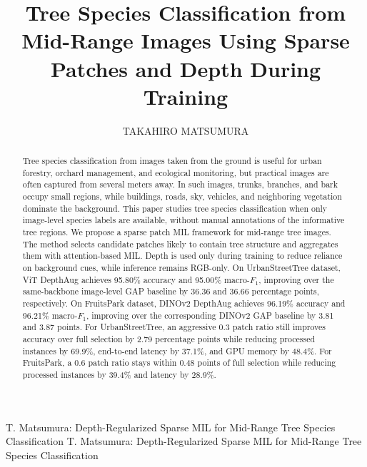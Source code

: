 \documentclass{ieeeaccess}
\begin{document}

\title{Tree Species Classification from Mid-Range Images Using Sparse Patches and Depth During Training}

\author{\uppercase{Takahiro Matsumura}}

\address[1]{Affiliation to be confirmed.}


\markboth
{T. Matsumura: Depth-Regularized Sparse MIL for Mid-Range Tree Species Classification}
{T. Matsumura: Depth-Regularized Sparse MIL for Mid-Range Tree Species Classification}


\begin{abstract}
Tree species classification from images taken from the ground is useful for urban forestry, orchard
management, and ecological monitoring, but practical images are often captured from several meters
away. In such images, trunks, branches, and bark occupy small regions, while buildings, roads, sky,
vehicles, and neighboring vegetation dominate the background. This paper studies tree species
classification when only image-level species labels are available, without manual annotations of the
informative tree regions. We propose a sparse patch MIL framework for mid-range tree images. The
method selects candidate patches likely to contain tree structure and aggregates them with
attention-based MIL. Depth is used only during training to reduce reliance on background cues, while
inference remains RGB-only. On UrbanStreetTree dataset, ViT DepthAug achieves 95.80\% accuracy and
95.00\% macro-$F_1$, improving over the same-backbone image-level GAP baseline by 36.36 and 36.66
percentage points, respectively. On FruitsPark dataset, DINOv2 DepthAug achieves 96.19\% accuracy
and 96.21\% macro-$F_1$, improving over the corresponding DINOv2 GAP baseline by 3.81 and 3.87
points. For UrbanStreetTree, an aggressive 0.3 patch ratio still improves accuracy over full
selection by 2.79 percentage points while reducing processed instances by 69.9\%, end-to-end latency
by 37.1\%, and GPU memory by 48.4\%. For FruitsPark, a 0.6 patch ratio stays within 0.48 points of
full selection while reducing processed instances by 39.4\% and latency by 28.9\%.
\end{abstract}
\end{document}
